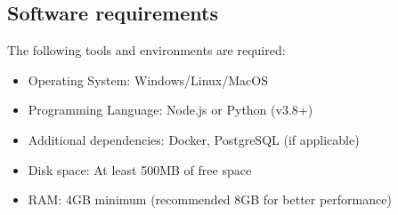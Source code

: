 \documentclass{article}
\begin{document}
\subsection{Software requirements}

The following tools and environments are required:

\begin{itemize}
    \item Operating System\@: Windows/Linux/MacOS
    \item Programming Language\@: Node.js or Python (v3.8+)
    \item Additional dependencies\@: Docker, PostgreSQL (if applicable)
    \item Disk space\@: At least 500MB of free space
    \item RAM\@: 4GB minimum (recommended 8GB for better performance)
\end{itemize}
\end{document}
